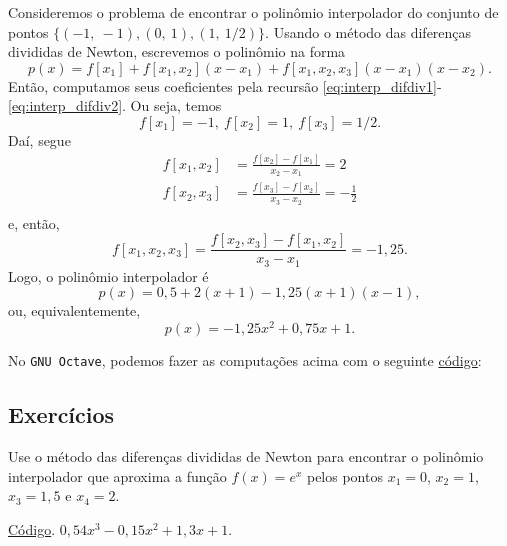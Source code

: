\begin{ex}
  Consideremos o problema de encontrar o polinômio interpolador do conjunto de pontos $\{(-1,~-1), (0,~1), (1,~1/2)\}$. Usando o método das diferenças divididas de Newton, escrevemos o polinômio na forma
  \begin{equation}
    p(x) = f[x_1] + f[x_1,x_2](x-x_1) + f[x_1,x_2,x_3](x-x_1)(x-x_2).
  \end{equation}
  Então, computamos seus coeficientes pela recursão \eqref{eq:interp_difdiv1}-\eqref{eq:interp_difdiv2}. Ou seja, temos
  \begin{equation}
    f[x_1]=-1,~f[x_2]=1,~f[x_3]=1/2.
  \end{equation}
  Daí, segue
  \begin{align}
    f[x_1,x_2] &= \frac{f[x_2]-f[x_1]}{x_2-x_1} = 2\\
    f[x_2,x_3] &= \frac{f[x_3]-f[x_2]}{x_3-x_2} = -\frac{1}{2}\\
  \end{align}
  e, então,
  \begin{equation}
    f[x_1,x_2,x_3] = \frac{f[x_2,x_3]-f[x_1,x_2]}{x_3-x_1}=-1,25.
  \end{equation}
  Logo, o polinômio interpolador é
  \begin{equation}
    p(x) = 0,5 + 2(x+1) - 1,25(x+1)(x-1),
  \end{equation}
  ou, equivalentemente,
  \begin{equation}
    p(x) = -1,25x^2 + 0,75x + 1.
  \end{equation}

\ifisoctave
No \verb+GNU Octave+, podemos fazer as computações acima com o seguinte \href{https://github.com/phkonzen/notas/blob/master/src/MatematicaNumerica/cap_interp/dados/ex_interpoli_difdiv/ex_interpoli_difdiv.m}{código}:

\fi
\end{ex}

\subsection*{Exercícios}

\begin{exer}\label{exer_interpoli_difdiv1}
  Use o método das diferenças divididas de Newton para encontrar o polinômio interpolador que aproxima a função $f(x)=e^{x}$ pelos pontos $x_1=0$, $x_2=1$, $x_3=1,5$ e $x_4=2$.
\end{exer}
\begin{resp}
\ifisoctave
\href{https://github.com/phkonzen/notas/blob/master/src/MatematicaNumerica/cap_interp/dados/exer_interpoli_dfidiv1/exer_interpoli_difdiv1.m}{Código}.
\fi
$0,54x^3 - 0,15x^2 + 1,3x + 1$.
\end{resp}

